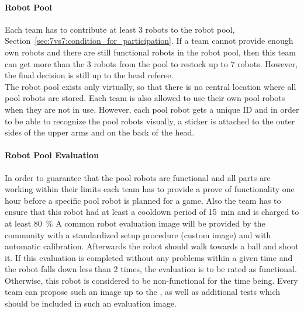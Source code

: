         \paragraph{Robot Pool}
            Each team has to contribute at least 3 robots to the robot pool, \cf Section~\ref{sec:7vs7:condition_for_participation}. If a team cannot provide enough own robots and there are still functional robots in the robot pool, then this team can get more than the 3 robots from the pool to restock up to 7 robots. However, the final decision is still up to the head referee. \\
            The robot pool exists only virtually, so that there is no central location where all pool robots are stored. Each team is also allowed to use their own pool robots when they are not in use. However, each pool robot gets a unique ID and in order to be able to recognize the pool robots visually, a sticker is attached to the outer sides of the upper arms and on the back of the head.

        \paragraph{Robot Pool Evaluation}
            In order to guarantee that the pool robots are functional and all parts are working within their limits each team has to provide a prove of functionality one hour before a specific pool robot is planned for a game. Also the team has to ensure that this robot had at least a cooldown period of \qty{15}{\minute} and is charged to at least \qty{80}{\percent}
            A common robot evaluation image will be provided by the community with a standardized setup procedure (custom image) and with automatic calibration. Afterwards the robot should walk towards a ball and shoot it. If this evaluation is completed without any problems within a given time  and the robot falls down less than 2 times, the evaluation is to be rated as functional. Otherwise, this robot is considered to be non-functional for the time being. Every team can propose such an image up to the , as well as additional tests which should be included in such an evaluation image.

